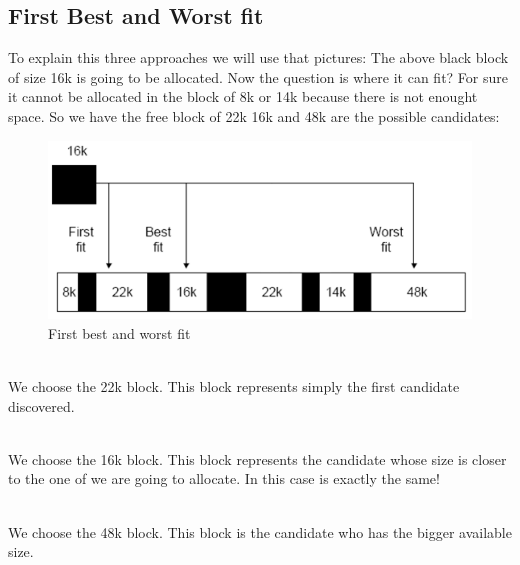 \documentclass[11pt]{article}
\begin{document}
\subsection{First Best and Worst fit}
To explain this three approaches we will use that pictures:
The above black block of size 16k is going to be allocated. Now the question is where it can fit? For sure it cannot be allocated in the block of 8k or 14k because there is not enought space. So we have the free block of 22k 16k and 48k are the possible candidates:
\begin{description}
\begin{figure}[H]
\centering
\includegraphics*{fbw}
\caption{First best and worst fit}
\end{figure}
  \item[First fit] \hfill \\
  We choose the 22k block. This block represents simply the first candidate discovered.
  \item[Best fit] \hfill \\
    We choose the 16k block. This block represents the candidate whose size is closer to the one of we are going to allocate. In this case is exactly the same!
  \item[Worst fit] \hfill \\
  We choose the 48k block. This block is the candidate who has the bigger available size.
\end{description}
\end{document}
